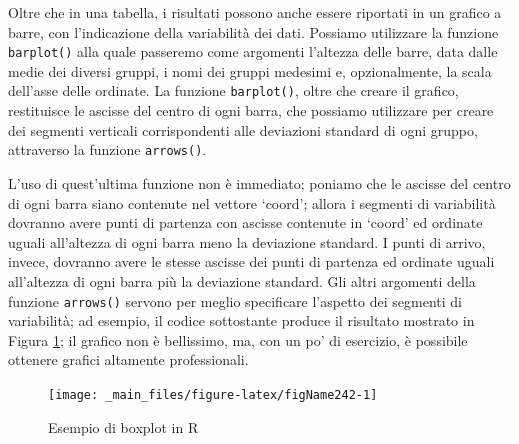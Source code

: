 \documentclass[a4paper,12pt,oneside]{book}
\newenvironment{Shaded}{\begin{snugshade}}{\end{snugshade}}
\newcommand{\DecValTok}[1]{#1}
\newcommand{\FloatTok}[1]{#1}
\newcommand{\SpecialCharTok}[1]{#1}
\newcommand{\OtherTok}[1]{#1}
\newcommand{\FunctionTok}[1]{#1}
\newcommand{\AttributeTok}[1]{#1}
\newcommand{\NormalTok}[1]{#1}
\begin{document}
Oltre che in una tabella, i risultati possono anche essere riportati in un grafico a barre, con l'indicazione della variabilità dei dati. Possiamo utilizzare la funzione \texttt{barplot()} alla quale passeremo come argomenti l'altezza delle barre, data dalle medie dei diversi gruppi, i nomi dei gruppi medesimi e, opzionalmente, la scala dell'asse delle ordinate. La funzione \texttt{barplot()}, oltre che creare il grafico, restituisce le ascisse del centro di ogni barra, che possiamo utilizzare per creare dei segmenti verticali corrispondenti alle deviazioni standard di ogni gruppo, attraverso la funzione \texttt{arrows()}.

L'uso di quest'ultima funzione non è immediato; poniamo che le ascisse del centro di ogni barra siano contenute nel vettore `coord'; allora i segmenti di variabilità dovranno avere punti di partenza con ascisse contenute in `coord' ed ordinate uguali all'altezza di ogni barra meno la deviazione standard. I punti di arrivo, invece, dovranno avere le stesse ascisse dei punti di partenza ed ordinate uguali all'altezza di ogni barra più la deviazione standard. Gli altri argomenti della funzione \texttt{arrows()} servono per meglio specificare l'aspetto dei segmenti di variabilità; ad esempio, il codice sottostante produce il risultato mostrato in Figura \ref{fig:figName242}; il grafico non è bellissimo, ma, con un po' di esercizio, è possibile ottenere grafici altamente professionali.

\begin{Shaded}
\end{Shaded}

\begin{figure}

{\centering \texttt{[image: \_main\_files/figure-latex/figName242-1]} 

}

\caption{Esempio di boxplot in R}\label{fig:figName242}
\end{figure}
\end{document}
